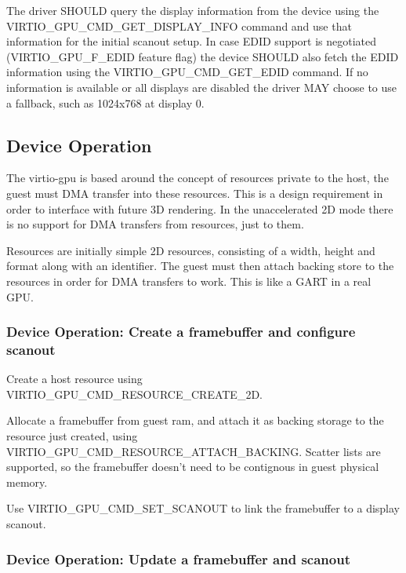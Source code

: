 The driver SHOULD query the display information from the device using
the VIRTIO_GPU_CMD_GET_DISPLAY_INFO command and use that information
for the initial scanout setup.  In case EDID support is negotiated
(VIRTIO_GPU_F_EDID feature flag) the device SHOULD also fetch the EDID
information using the VIRTIO_GPU_CMD_GET_EDID command.  If no
information is available or all displays are disabled the driver MAY
choose to use a fallback, such as 1024x768 at display 0.

\subsection{Device Operation}\label{sec:Device Types / GPU Device / Device Operation}

The virtio-gpu is based around the concept of resources private to the
host, the guest must DMA transfer into these resources. This is a
design requirement in order to interface with future 3D rendering. In
the unaccelerated 2D mode there is no support for DMA transfers from
resources, just to them.

Resources are initially simple 2D resources, consisting of a width,
height and format along with an identifier. The guest must then attach
backing store to the resources in order for DMA transfers to
work. This is like a GART in a real GPU.

\subsubsection{Device Operation: Create a framebuffer and configure scanout}

\begin{itemize*}
\item Create a host resource using VIRTIO_GPU_CMD_RESOURCE_CREATE_2D.
\item Allocate a framebuffer from guest ram, and attach it as backing
  storage to the resource just created, using
  VIRTIO_GPU_CMD_RESOURCE_ATTACH_BACKING.  Scatter lists are
  supported, so the framebuffer doesn't need to be contignous in guest
  physical memory.
\item Use VIRTIO_GPU_CMD_SET_SCANOUT to link the framebuffer to
  a display scanout.
\end{itemize*}

\subsubsection{Device Operation: Update a framebuffer and scanout}

